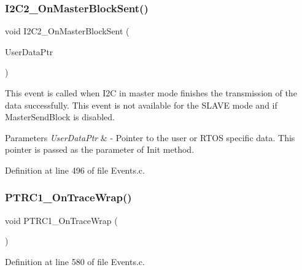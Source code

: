 \subsubsection{\texorpdfstring{I2\+C2\+\_\+\+On\+Master\+Block\+Sent()}{I2C2\_OnMasterBlockSent()}}
{\footnotesize\ttfamily void I2\+C2\+\_\+\+On\+Master\+Block\+Sent (\begin{DoxyParamCaption}\item[{L\+D\+D\+\_\+\+T\+User\+Data $\ast$}]{User\+Data\+Ptr }\end{DoxyParamCaption})}



This event is called when I2C in master mode finishes the transmission of the data successfully. This event is not available for the S\+L\+A\+VE mode and if Master\+Send\+Block is disabled. 


\begin{DoxyParams}{Parameters}
{\em User\+Data\+Ptr} & -\/ Pointer to the user or R\+T\+OS specific data. This pointer is passed as the parameter of Init method. \\
\hline
\end{DoxyParams}


Definition at line 496 of file Events.\+c.

\mbox{\label{group___events__module_gab34bedda0461474d770bfe84c3bc881f}} 
\subsubsection{\texorpdfstring{P\+T\+R\+C1\+\_\+\+On\+Trace\+Wrap()}{PTRC1\_OnTraceWrap()}}
{\footnotesize\ttfamily void P\+T\+R\+C1\+\_\+\+On\+Trace\+Wrap (\begin{DoxyParamCaption}\item[{void}]{ }\end{DoxyParamCaption})}



Definition at line 580 of file Events.\+c.

\mbox{\label{group___events__module_ga2f94110e651cb30cba928647e91e92d4}} 
